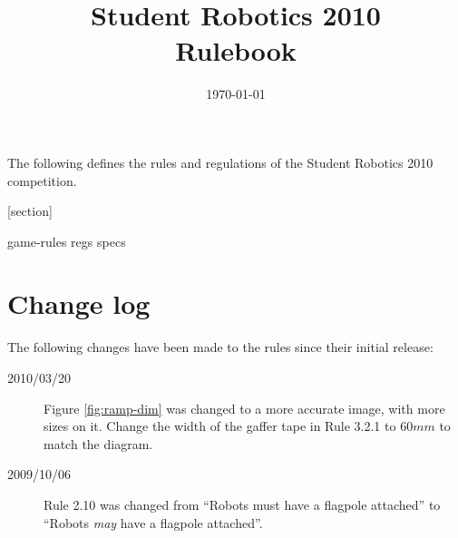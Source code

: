 \documentclass[a4paper, 12pt]{article}
\title {Student Robotics 2010\\ Rulebook}
\date{\today}
\begin{document}
\maketitle

\noindent The following defines the rules and regulations of the Student Robotics 2010 competition.

[section]
\newcommand{\rcn}{\stepcounter{rule}\arabic{section}.\arabic{rule}}
\renewcommand{\labelenumi}{\rcn}

 {game-rules}
\newpage
 {regs}
\newpage
 {specs}

\section{Change log}
The following changes have been made to the rules since their initial release:
\begin{description}
\item [2010/03/20] Figure \ref{fig:ramp-dim} was changed to a more accurate image, with more sizes on it.
 Change the width of the gaffer tape in Rule 3.2.1 to $60mm$ to match the diagram.
\item [2009/10/06] Rule 2.10 was changed from ``Robots must have a flagpole attached'' to ``Robots \emph{may} have a flagpole attached''.
\end{description}
\end{document}
